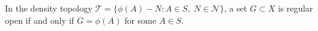 In the density topology $\mathcal{T} = \{\phi(A) - N : A \in S,\; N \in \mathcal{N}\}$, a set $G \subset X$ is regular open if and only if $G = \phi(A)$ for some $A \in S$.
